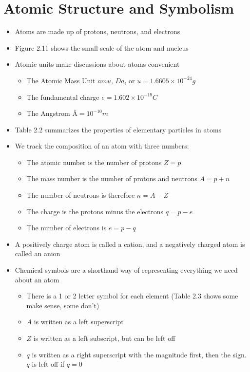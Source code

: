 \documentclass[12pt, openany, letterpaper]{memoir}
\begin{document}
\section{Atomic Structure and Symbolism}
\begin{itemize}
  \item Atoms are made up of protons, neutrons, and electrons
  \item Figure 2.11 shows the small scale of the atom and nucleus
  \item Atomic units make discussions about atoms convenient
  \begin{itemize}
    \item The Atomic Mass Unit $amu$, $Da$, or $u = 1.6605\times10^{-24}g$
    \item The fundamental charge $e = 1.602\times10^{-19}C$
    \item The Angstrom \AA$=10^{-10}m$
  \end{itemize}
  \item Table 2.2 summarizes the properties of elementary particles in atoms
  \item We track the composition of an atom with three numbers:
  \begin{itemize}
    \item The atomic number is the number of protons $Z=p$ 
    \item The mass number is the number of protons and neutrons $A=p+n$ 
    \item The number of neutrons is therefore $n=A-Z$
    \item The charge is the protons minus the electrons $q=p-e$
    \item The number of electrons is $e=p-q$
  \end{itemize}
  \item A positively charge atom is called a cation, and a negatively charged atom is called an anion
  \item Chemical symbols are a shorthand way of representing everything we need about an atom
  \begin{itemize}
    \item There is a 1 or 2 letter symbol for each element (Table 2.3 shows some make sense, some don't)
    \item $A$ is written as a left superscript
    \item $Z$ is written as a left subscript, but can be left off
    \item $q$ is written as a right superscript with the magnitude first, then the sign. $q$ is left off if $q=0$

\end{itemize}
\end{itemize}
\end{document}
